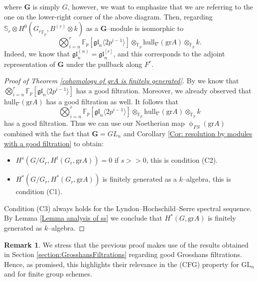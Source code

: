 \documentclass{article}
\theoremstyle{plain}
\theoremstyle{definition}
\newtheorem{Rem}[Th]{Remark}
\newcommand{\GL}{\mathrm{GL}}
\begin{document}
\noindent where $\mathbf{G}$ is simply $G$, however, we want to emphasize that we are referring to the one on the lower-right corner of the above diagram. Then, regarding $\mathbb{S}_r\otimes H^0({G_r}_{\mathbb{F}_p},B^{(r)}\otimes k)$ as a $\mathbf{G}$--module is isomorphic to 
\[
\bigotimes_{i=n}^r\mathbb{F}_p[\mathfrak{gl}_n\langle 2p^{i-1}\rangle]\otimes_{\mathbb{F}_p} \mathrm{hull}_\nabla(\mathrm{gr}A) \otimes_{\mathbb{F}_p}k. 
\]
Indeed, we know that  $\mathfrak{gl}_n^{(n)}=\mathfrak{gl}_n^{[r]}$, and this corresponds to the adjoint representation of $\mathbf{G}$ under the pullback along $F^r$.  

\begin{proof}[Proof of Theorem \ref{cohomology of grA is finitely generated}]
    By \cite{ABW82} we know that $\bigotimes_{i=n}^r\mathbb{F}_p[\mathfrak{gl}_n\langle 2p^{i-1}\rangle]$ has a good filtration. Moreover, we already observed that $\mathrm{hull}_\nabla(\mathrm{gr}A)$ has a good filtration as well. It follows that 
    \[
    \bigotimes_{i=n}^r\mathbb{F}_p[\mathfrak{gl}_n\langle 2p^{i-1}\rangle]\otimes_{\mathbb{F}_p} \mathrm{hull}_\nabla(\mathrm{gr}A) \otimes_{\mathbb{F}_p}k
    \]
    has a good filtration. Thus we can use our Noetherian map $\upphi_{FS}(\mathrm{gr}A)$ combined with the fact that $\mathbf{G}=GL_n$ and Corollary \ref{Cor: resolution by modules with a good filtration} to obtain:
    
    \begin{itemize}
    \item $H^s(G/G_r,H^t(G_r,\mathrm{gr}A))=0$ if $s>>0$, this is condition (C2).
    \item $H^\ast(G/G_r,H^\ast(G_r,\mathrm{gr}A))$ is finitely generated as a $k$--algebra, this is condition (C1).
\end{itemize}
 Condition (C3) always holds for the Lyndon–Hochschild–Serre spectral sequence. By Lemma \ref{Lemma analysis of ss} we conclude that $H^\ast(G,\mathrm{gr}A)$ is finitely generated as $k$--algebra.
\end{proof}

\begin{Rem}
    We stress that the previous proof makes use of the results obtained in Section \ref{section:GrosshansFiltrations} regarding good Grosshans filtrations. Hence, as promised, this highlights their relevance in the (CFG) property for $\GL_n$ and for finite group schemes.
\end{Rem}

\end{document}
